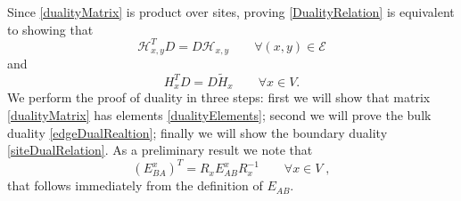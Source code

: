 \documentclass[10pt]{article}
\numberwithin{equation}{section}
\numberwithin{equation}{subsection}
\newcommand{\co}{\;,}
\begin{document}
Since \eqref{dualityMatrix} is product over sites, proving \eqref{DualityRelation} is equivalent to showing that 
\begin{equation}\label{edgeDualRealtion}
    \mathcal{H}_{x,y}^{T}D=D\mathcal{H}_{x,y}\qquad \forall (x,y)\in \mathcal{E}
\end{equation}
and 
\begin{equation}\label{siteDualRelation}
    H_{x}^{T}D=D\widetilde{H}_{x}\qquad \forall x\in V.
\end{equation}
We perform the proof of duality in three steps: first we will show that matrix \eqref{dualityMatrix} has elements \eqref{dualityElements}; second we will prove the bulk duality \eqref{edgeDualRealtion}; finally we will show the boundary duality \eqref{siteDualRelation}. 
As a preliminary result we note that 
\begin{equation}\label{transpositionPropertyR}
(E_{BA}^{x})^{T}=R_{x}E_{AB}^{x}R_{x}^{-1}\qquad \forall x\in V\co
\end{equation}
that follows immediately from the definition of $E_{AB}$. 
\end{document}
